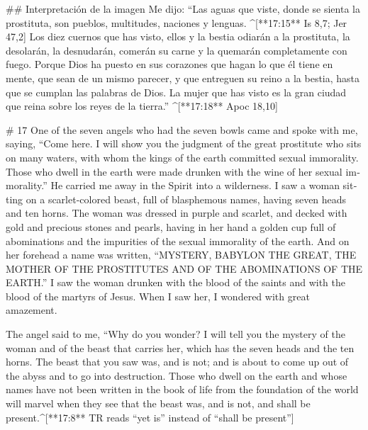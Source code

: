 \begin{paracols}{2}
## Interpretación de la imagen
 Me dijo: “Las aguas que viste, donde se sienta la prostituta, son pueblos, multitudes, naciones y lenguas. ^[**17:15** Is 8,7; Jer 47,2]  Los diez cuernos que has visto, ellos y la bestia odiarán a la prostituta, la desolarán, la desnudarán, comerán su carne y la quemarán completamente con fuego.  Porque Dios ha puesto en sus corazones que hagan lo que él tiene en mente, que sean de un mismo parecer, y que entreguen su reino a la bestia, hasta que se cumplan las palabras de Dios.  La mujer que has visto es la gran ciudad que reina sobre los reyes de la tierra.” ^[**17:18** Apoc 18,10]

\switchcolumn
\begin{english}

# 17
 One of the seven angels who had the seven bowls came and spoke with me, saying, “Come here. I will show you the judgment of the great prostitute who sits on many waters,  with whom the kings of the earth committed sexual immorality. Those who dwell in the earth were made drunken with the wine of her sexual immorality.”  He carried me away in the Spirit into a wilderness. I saw a woman sitting on a scarlet-colored beast, full of blasphemous names, having seven heads and ten horns.  The woman was dressed in purple and scarlet, and decked with gold and precious stones and pearls, having in her hand a golden cup full of abominations and the impurities of the sexual immorality of the earth.  And on her forehead a name was written, “MYSTERY, BABYLON THE GREAT, THE MOTHER OF THE PROSTITUTES AND OF THE ABOMINATIONS OF THE EARTH.”  I saw the woman drunken with the blood of the saints and with the blood of the martyrs of Jesus. When I saw her, I wondered with great amazement. 

 The angel said to me, “Why do you wonder? I will tell you the mystery of the woman and of the beast that carries her, which has the seven heads and the ten horns.  The beast that you saw was, and is not; and is about to come up out of the abyss and to go into destruction. Those who dwell on the earth and whose names have not been written in the book of life from the foundation of the world will marvel when they see that the beast was, and is not, and shall be present.^[**17:8** TR reads “yet is” instead of “shall be present”] 


\end{english}
\end{paracols}
